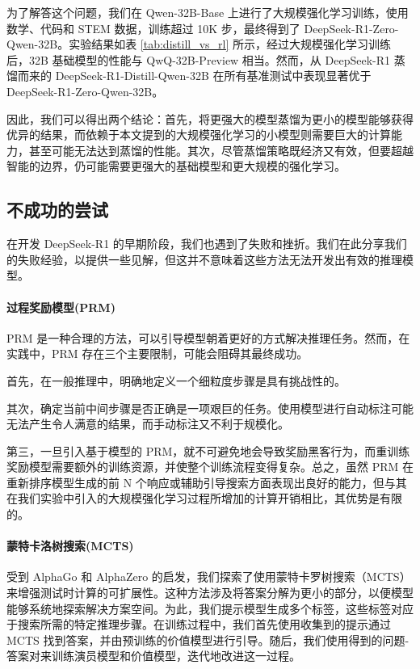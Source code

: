 \documentclass[lang=cn,a4paper,newtx]{elegantpaper}
\newcommand{\dsri}{DeepSeek-R1}
\newcommand{\dsro}{DeepSeek-R1-Zero}
\begin{document}
为了解答这个问题，我们在 Qwen-32B-Base 上进行了大规模强化学习训练，使用数学、代码和 STEM 数据，训练超过 10K 步，最终得到了 \dsro{}-Qwen-32B。实验结果如表 \ref{tab:distill_vs_rl} 所示，经过大规模强化学习训练后，32B 基础模型的性能与 QwQ-32B-Preview 相当。然而，从 DeepSeek-R1 蒸馏而来的 DeepSeek-R1-Distill-Qwen-32B 在所有基准测试中表现显著优于 \dsro{}-Qwen-32B。

因此，我们可以得出两个结论：首先，将更强大的模型蒸馏为更小的模型能够获得优异的结果，而依赖于本文提到的大规模强化学习的小模型则需要巨大的计算能力，甚至可能无法达到蒸馏的性能。其次，尽管蒸馏策略既经济又有效，但要超越智能的边界，仍可能需要更强大的基础模型和更大规模的强化学习。

\subsection{不成功的尝试}

在开发 \dsri{} 的早期阶段，我们也遇到了失败和挫折。我们在此分享我们的失败经验，以提供一些见解，但这并不意味着这些方法无法开发出有效的推理模型。

\paragraph{过程奖励模型(PRM)}

PRM 是一种合理的方法，可以引导模型朝着更好的方式解决推理任务。然而，在实践中，PRM 存在三个主要限制，可能会阻碍其最终成功。

首先，在一般推理中，明确地定义一个细粒度步骤是具有挑战性的。 

其次，确定当前中间步骤是否正确是一项艰巨的任务。使用模型进行自动标注可能无法产生令人满意的结果，而手动标注又不利于规模化。

第三，一旦引入基于模型的 PRM，就不可避免地会导致奖励黑客行为，而重训练奖励模型需要额外的训练资源，并使整个训练流程变得复杂。总之，虽然 PRM 在重新排序模型生成的前 N 个响应或辅助引导搜索方面表现出良好的能力，但与其在我们实验中引入的大规模强化学习过程所增加的计算开销相比，其优势是有限的。

\paragraph{蒙特卡洛树搜索(MCTS)}

受到 AlphaGo 和 AlphaZero 的启发，我们探索了使用蒙特卡罗树搜索（MCTS）来增强测试时计算的可扩展性。这种方法涉及将答案分解为更小的部分，以便模型能够系统地探索解决方案空间。为此，我们提示模型生成多个标签，这些标签对应于搜索所需的特定推理步骤。在训练过程中，我们首先使用收集到的提示通过 MCTS 找到答案，并由预训练的价值模型进行引导。随后，我们使用得到的问题-答案对来训练演员模型和价值模型，迭代地改进这一过程。
\end{document}
